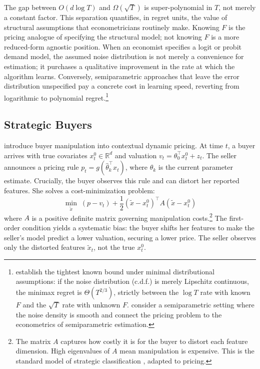 The gap between $O(d \log T)$ and $\Omega(\sqrt{T})$ is super-polynomial in $T$, not merely a constant factor. This separation quantifies, in regret units, the value of structural assumptions that econometricians routinely make. Knowing $F$ is the pricing analogue of specifying the structural model; not knowing $F$ is a more reduced-form agnostic position. When an economist specifies a logit or probit demand model, the assumed noise distribution is not merely a convenience for estimation; it purchases a qualitative improvement in the rate at which the algorithm learns. Conversely, semiparametric approaches that leave the error distribution unspecified pay a concrete cost in learning speed, reverting from logarithmic to polynomial regret.\footnote{\citet{Tullii2024} establish the tightest known bound under minimal distributional assumptions: if the noise distribution (c.d.f.) is merely Lipschitz continuous, the minimax regret is $\Theta(T^{2/3})$, strictly between the $\log T$ rate with known $F$ and the $\sqrt{T}$ rate with unknown $F$. \citet{Fan2024} consider a semiparametric setting where the noise density is smooth and connect the pricing problem to the econometrics of semiparametric estimation.}

\subsection{Strategic Buyers}
\label{sec:liu}

\citet{Liu2024strategic} introduce buyer manipulation into contextual dynamic pricing. At time $t$, a buyer arrives with true covariates $x_t^0 \in \mathbb{R}^d$ and valuation $v_t = \theta_0^\top x_t^0 + z_t$. The seller announces a pricing rule $p_t = g(\hat{\theta}_k^\top x_t)$, where $\hat{\theta}_k$ is the current parameter estimate. Crucially, the buyer observes this rule and can distort her reported features. She solves a cost-minimization problem:
\begin{equation}
\label{eq:manipulation}
\min_{\tilde{x}} \; (p - v_t) + \frac{1}{2}(\tilde{x} - x_t^0)^\top A (\tilde{x} - x_t^0)
\end{equation}
where $A$ is a positive definite matrix governing manipulation costs.\footnote{The matrix $A$ captures how costly it is for the buyer to distort each feature dimension. High eigenvalues of $A$ mean manipulation is expensive. This is the standard model of strategic classification \citep{Hardt2016}, adapted to pricing.} The first-order condition yields a systematic bias: the buyer shifts her features to make the seller's model predict a lower valuation, securing a lower price. The seller observes only the distorted features $\tilde{x}_t$, not the true $x_t^0$.

